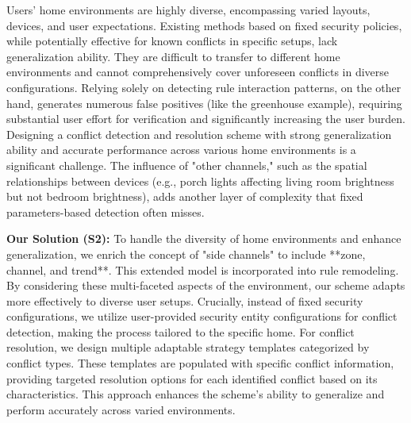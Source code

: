 Users' home environments are highly diverse, encompassing varied layouts, devices, and user expectations. Existing methods based on fixed security policies, while potentially effective for known conflicts in specific setups, lack generalization ability. They are difficult to transfer to different home environments and cannot comprehensively cover unforeseen conflicts in diverse configurations. Relying solely on detecting rule interaction patterns, on the other hand, generates numerous false positives (like the greenhouse example), requiring substantial user effort for verification and significantly increasing the user burden. Designing a conflict detection and resolution scheme with strong generalization ability and accurate performance across various home environments is a significant challenge. The influence of "other channels," such as the spatial relationships between devices (e.g., porch lights affecting living room brightness but not bedroom brightness), adds another layer of complexity that fixed parameters-based detection often misses.

\textbf{Our Solution (S2):} To handle the diversity of home environments and enhance generalization, we enrich the concept of "side channels" to include **zone, channel, and trend**. This extended model is incorporated into rule remodeling. By considering these multi-faceted aspects of the environment, our scheme adapts more effectively to diverse user setups. Crucially, instead of fixed security configurations, we utilize user-provided security entity configurations for conflict detection, making the process tailored to the specific home. For conflict resolution, we design multiple adaptable strategy templates categorized by conflict types. These templates are populated with specific conflict information, providing targeted resolution options for each identified conflict based on its characteristics. This approach enhances the scheme's ability to generalize and perform accurately across varied environments.

